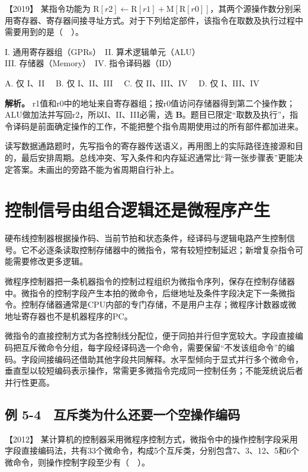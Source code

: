 \noindent{}【2019】 某指令功能为 \(\mathrm R[r2]\leftarrow\mathrm R[r1]+\mathrm M[\mathrm R[r0]]\)，其两个源操作数分别采用寄存器、寄存器间接寻址方式。对于下列给定部件，该指令在取数及执行过程中需要用到的是（　）。

I. 通用寄存器组（GPRs）　II. 算术逻辑单元（ALU）\\
III. 存储器（Memory）　IV. 指令译码器（ID）

A. 仅 I、II　 B. 仅 I、II、III　 C. 仅 II、III、IV　 D. 仅 I、III、IV


\textbf{解析。} r1值和r0中的地址来自寄存器组；按r0值访问存储器得到第二个操作数；ALU做加法并写回r2，所以I、II、III必需，选 \textbf{B}。题目已限定``取数及执行''，指令译码是前面确定操作的工作，不能把整个指令周期使用过的所有部件都加进来。

读写数据通路题时，先写指令的寄存器传送语义，再用图上的实际路径连接源和目的，最后安排周期。总线冲突、写入条件和内存延迟通常比``背一张步骤表''更能决定答案。未画出的旁路不能为省周期自行补上。

\section{控制信号由组合逻辑还是微程序产生}\label{co-05-04}

硬布线控制器根据操作码、当前节拍和状态条件，经译码与逻辑电路产生控制信号。它不必逐条读取控制存储器中的微指令，常有较短控制延迟；新增复杂指令可能需要修改更多逻辑。

微程序控制器把一条机器指令的控制过程组织为微指令序列，保存在控制存储器中。微指令的控制字段产生本拍的微命令，后继地址及条件字段决定下一条微指令。控制存储器通常是CPU内部的专门存储，不是用户主存；微程序计数器或微地址寄存器也不是机器程序的PC。

微指令的直接控制方式为各控制线分配位，便于同拍并行但字宽较大。字段直接编码把互斥微命令分组，每字段经译码选一个命令，需要保留``不发该组命令''的编码。字段间接编码还借助其他字段共同解释。水平型倾向于显式并行多个微命令，垂直型以较短编码表示操作，常需更多微指令完成同一控制任务；不能笼统说后者并行性更高。

\subsection{例 5-4　互斥类为什么还要一个空操作编码}\label{co-ex5-4}

\noindent{}【2012】 某计算机的控制器采用微程序控制方式，微指令中的操作控制字段采用字段直接编码法，共有33个微命令，构成5个互斥类，分别包含7、3、12、5和6个微命令，则操作控制字段至少有（　）。


